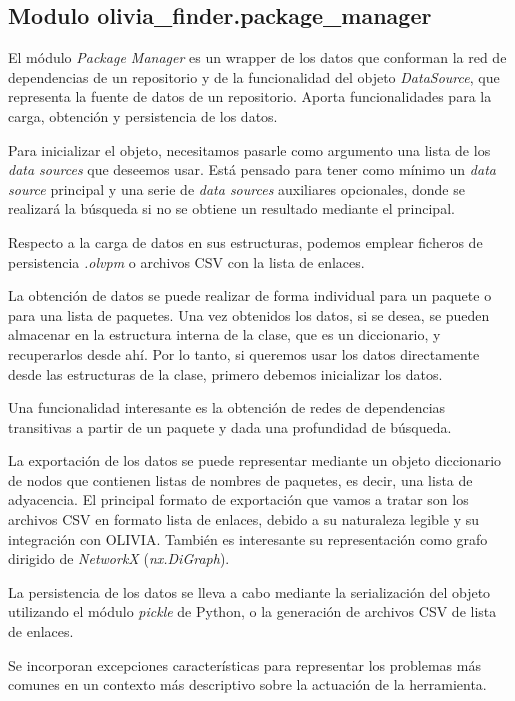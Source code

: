 \subsection{Modulo olivia\_finder.package\_manager}

El módulo \textit{Package Manager} es un wrapper de los datos que conforman la red de dependencias de
 un repositorio y de la funcionalidad del objeto \textit{DataSource}, que representa la fuente de 
 datos de un repositorio. Aporta funcionalidades para la carga, obtención y persistencia de los datos.

Para inicializar el objeto, necesitamos pasarle como argumento una lista de los \textit{data sources} 
que deseemos usar. Está pensado para tener como mínimo un \textit{data source} principal y una serie 
de \textit{data sources} auxiliares opcionales, donde se realizará la búsqueda si no se obtiene un 
resultado mediante el principal.

Respecto a la carga de datos en sus estructuras, podemos emplear ficheros de 
persistencia \textit{.olvpm} o archivos CSV con la lista de enlaces.

La obtención de datos se puede realizar de forma individual para un paquete o para una lista de 
paquetes. Una vez obtenidos los datos, si se desea, se pueden almacenar en la estructura interna 
de la clase, que es un diccionario, y recuperarlos desde ahí. Por lo tanto, si queremos usar los 
datos directamente desde las estructuras de la clase, primero debemos inicializar los datos.

Una funcionalidad interesante es la obtención de redes de dependencias transitivas a partir de un 
paquete y dada una profundidad de búsqueda.

La exportación de los datos se puede representar mediante un objeto diccionario de nodos que 
contienen listas de nombres de paquetes, es decir, una lista de adyacencia. El principal formato 
de exportación que vamos a tratar son los archivos CSV en formato lista de enlaces, debido a su 
naturaleza legible y su integración con OLIVIA. También es interesante su representación como 
grafo dirigido de \textit{NetworkX} (\textit{nx.DiGraph}).

La persistencia de los datos se lleva a cabo mediante la serialización del objeto utilizando el 
módulo \textit{pickle} de Python, o la generación de archivos CSV de lista de enlaces.

Se incorporan excepciones características para representar los problemas más comunes en un contexto 
más descriptivo sobre la actuación de la herramienta.

